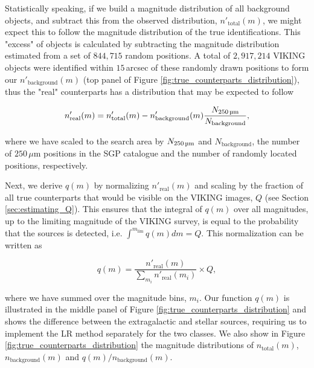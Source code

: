
Statistically speaking, if we build a magnitude distribution of all background objects, and subtract this from the observed distribution, $n'_{\textrm{total}}(m)$, we might expect this to follow the magnitude distribution of the true identifications. This "excess" of objects is calculated by subtracting the magnitude distribution estimated from a set of $844,715$ random positions. A total of $2,917,214$ VIKING objects were identified within $15\,$arcsec of these randomly drawn positions to form our $n'_{\textrm{background}}(m)$ (top panel of Figure \ref{fig:true_counterparts_distribution}), thus the "real" counterparts has a distribution that may be expected to follow

\begin{equation}
    n'_{\textrm{real}}(m) = n'_{\textrm{total}}(m) - n'_{\textrm{background}}(m) \frac{N_{\textrm{250\,\micron}}}{N_{\textrm{background}}},
\label{eq:real_distribution}
\end{equation}

\noindent where we have scaled to the search area by $N_{\textrm{250\,\micron}}$ and $N_{\textrm{background}}$, the number of $250\,\mu$m positions in the SGP catalogue and the number of randomly located positions, respectively.

Next, we derive $q(m)$ by normalizing $n'_{\textrm{real}}(m)$ and scaling by the fraction of all true counterparts that would be visible on the VIKING images, $Q$ (see Section \ref{sec:estimating_Q}). This ensures that the integral of $q(m)$ over all magnitudes, up to the limiting magnitude of the VIKING survey, is equal to the probability that the sources is detected, i.e. $\int^{m_{\textrm{lim}}} q(m)dm = Q$. This normalization can be written as

\begin{equation}
\label{eq:true_counterparts_distribution}
    q(m) = \frac{n'_{\textrm{real}}(m)}{\sum_{m_i}n'_{\textrm{real}}(m_i)}\times Q,
\end{equation}

\noindent where we have summed over the magnitude bins, $m_i$. Our function $q(m)$ is illustrated in the middle panel of Figure \ref{fig:true_counterparts_distribution} and shows the difference between the extragalactic and stellar sources, requiring us to implement the LR method separately for the two classes. We also show in Figure \ref{fig:true_counterparts_distribution} the magnitude distributions of $n_{\textrm{total}}(m)$, $n_{\textrm{background}}(m)$ and $q(m)/n_{\textrm{background}}(m)$. 

